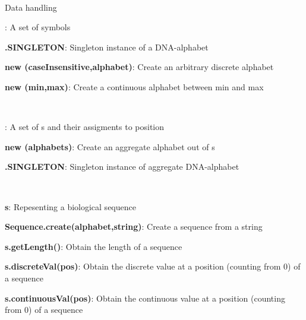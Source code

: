 \documentclass[10pt]{scrartcl}
\newcommand{\entry}[3]{{\bfseries #1#2}: #3}
\begin{document}
\thispagestyle{empty}


\renewcommand{\section}[1]{{
~\vspace{-0.1cm}

\large\sfb #1\vspace{0.1cm}\\}


}
\begin{flushleft}
\footnotesize
\section{Data handling}

\entry{\DNAAlphabet}{}{A set of symbols}

\entry{\DNAAlphabet}{.SINGLETON}{Singleton instance of a DNA-alphabet}

\entry{new \DiscreteAlphabet}{(caseInsensitive,alphabet)}{Create an arbitrary discrete alphabet}

\entry{new \ContinuousAlphabet}{(min,max)}{Create a continuous alphabet between min and max}

~

\entry{\AlphabetContainer}{}{A set of \Alphabet s and their assigments to position}

\entry{new \AlphabetContainer}{(alphabets)}{Create an aggregate alphabet out of \Alphabet s}

\entry{\DNAAlphabetContainer}{.SINGLETON}{Singleton instance of aggregate DNA-alphabet}


~

\entry{\Sequence}{ s}{Repesenting a biological sequence}

\entry{Sequence}{.create(alphabet,string)}{Create a sequence from a string}

\entry{s}{.getLength()}{Obtain the length of a sequence}

\entry{s}{.discreteVal(pos)}{Obtain the discrete value at a position (counting from 0) of a sequence}

\entry{s}{.continuousVal(pos)}{Obtain the continuous value at a position (counting from 0) of a sequence}

~


\end{flushleft}
\end{document}
